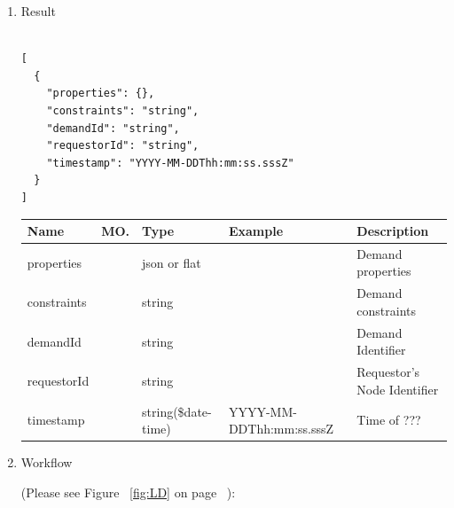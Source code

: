 \begin{enumerate}
\begin{table}[H]
\end{table}

\item Result

\begin{tcolorbox}[boxrule=0pt, frame empty]
\begin{verbatim}

[
  {
    "properties": {},
    "constraints": "string",
    "demandId": "string",
    "requestorId": "string",
    "timestamp": "YYYY-MM-DDThh:mm:ss.sssZ"
  }
]

\end{verbatim}
\end{tcolorbox}

\begin{table}[H]
\footnotesize

\begin{center}
\begin{tabular}{|p{3cm}|l|p{3cm}|p{3cm}|p{4cm}|} 
\hline
\rowcolor{lightgray}	Name	& MO.	& Type	& Example & 	Description \\
\hline

properties	& 	& 	json or flat	&		&	Demand properties \\ 
\hline

constraints	& 	& 	string	&		&	Demand constraints \\ 
\hline

demandId		&	&	string	&		& 	Demand Identifier \\
\hline

requestorId  & 	&	string	&		&	Requestor's Node Identifier \\
\hline

timestamp	&	& 	string(\$date-time)	& YYYY-MM-DDThh:mm:ss.sssZ	&	Time of ???  \\ 
\hline

\end{tabular}
\end{center}

\end{table}

\item Workflow

(Please see Figure ~\ref{fig:LD} on page ~\pageref{fig:LD}):


\end{enumerate}
